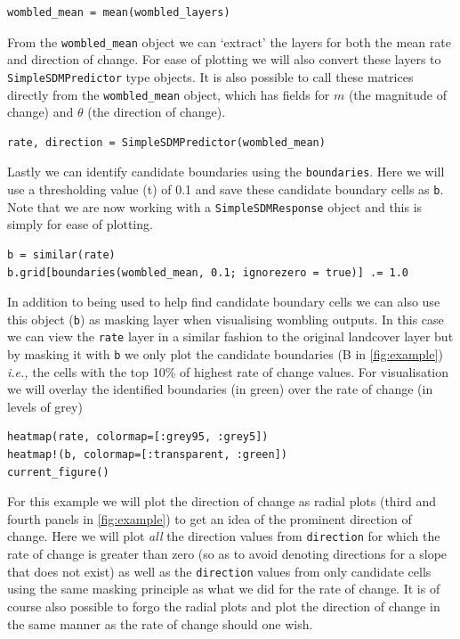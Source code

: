 \begin{verbatim}
wombled_mean = mean(wombled_layers)
\end{verbatim}

From the \texttt{wombled\_mean} object we can `extract' the layers for
both the mean rate and direction of change. For ease of plotting we will
also convert these layers to \texttt{SimpleSDMPredictor} type objects.
It is also possible to call these matrices directly from the
\texttt{wombled\_mean} object, which has fields for \(m\) (the magnitude
of change) and \(\theta\) (the direction of change).

\begin{verbatim}
rate, direction = SimpleSDMPredictor(wombled_mean)
\end{verbatim}

Lastly we can identify candidate boundaries using the
\texttt{boundaries}. Here we will use a thresholding value (t) of 0.1
and save these candidate boundary cells as \texttt{b}. Note that we are
now working with a \texttt{SimpleSDMResponse} object and this is simply
for ease of plotting.

\begin{verbatim}
b = similar(rate)
b.grid[boundaries(wombled_mean, 0.1; ignorezero = true)] .= 1.0
\end{verbatim}

In addition to being used to help find candidate boundary cells we can
also use this object (\texttt{b}) as masking layer when visualising
wombling outputs. In this case we can view the \texttt{rate} layer in a
similar fashion to the original landcover layer but by masking it with
\texttt{b} we only plot the candidate boundaries (B in \autoref{fig:example})
\emph{i.e.,} the cells with the top 10\% of highest rate of change
values. For visualisation we will overlay the identified boundaries (in
green) over the rate of change (in levels of grey)

\begin{verbatim}
heatmap(rate, colormap=[:grey95, :grey5])
heatmap!(b, colormap=[:transparent, :green])
current_figure()
\end{verbatim}

For this example we will plot the direction of change as radial plots
(third and fourth panels in \autoref{fig:example}) to get an idea of the
prominent direction of change. Here we will plot \emph{all} the
direction values from \texttt{direction} for which the rate of change is
greater than zero (so as to avoid denoting directions for a slope that
does not exist) as well as the \texttt{direction} values from only
candidate cells using the same masking principle as what we did for the
rate of change. It is of course also possible to forgo the radial plots
and plot the direction of change in the same manner as the rate of
change should one wish.


